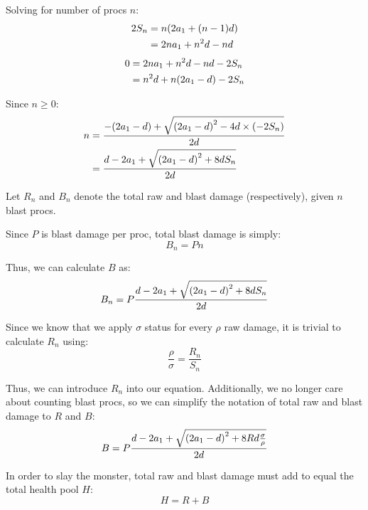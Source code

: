 \documentclass{article}
\begin{document}
Solving for number of procs $n$:
\begin{align}
    2 S_n &= n \parens*{2 a_1 + \parens*{n - 1} d} \\
          &= 2 n a_1 + n^2 d - n d
\end{align}
\begin{align}
    0 &= 2 n a_1 + n^2 d - n d - 2 S_n \\
      &= n^2 d + n \parens*{2 a_1 - d} - 2 S_n
\end{align}

Since $n \ge 0$:
\begin{align}
    n &= \frac{- \parens*{2 a_1 - d} + \sqrt{\parens*{2 a_1 - d}^2 - 4 d \times \parens*{- 2 S_n}}}{2 d} \\
      &= \frac{d - 2 a_1 + \sqrt{\parens*{2 a_1 - d}^2 + 8 d S_n}}{2 d}
    \label{eq:continuous_num_procs}
\end{align}

Let $R_n$ and $B_n$ denote the total raw and blast damage (respectively), given $n$ blast procs.

Since $P$ is blast damage per proc, total blast damage is simply:
\begin{equation}
    B_n = Pn
\end{equation}

Thus, we can calculate $B$ as:
\begin{equation}
    B_n = P \frac{d - 2 a_1 + \sqrt{\parens*{2 a_1 - d}^2 + 8 d S_n}}{2 d}
\end{equation}

Since we know that we apply $\sigma$ status for every $\rho$ raw damage, it is trivial to calculate $R_n$ using:
\begin{equation}
    \frac{\rho}{\sigma} = \frac{R_n}{S_n}
    \label{eq:rs_ratio}
\end{equation}

Thus, we can introduce $R_n$ into our equation. Additionally, we no longer care about counting blast procs, so we can simplify the notation of total raw and blast damage to $R$ and $B$:
\begin{equation}
    B = P \frac{d - 2 a_1 + \sqrt{\parens*{2 a_1 - d}^2 + 8 R d \frac{\sigma}{\rho} }}{2 d}
\end{equation}

In order to slay the monster, total raw and blast damage must add to equal the total health pool $H$:
\begin{equation}
    H = R + B
    \label{eq:h_eq_r_b}
\end{equation}
\end{document}
